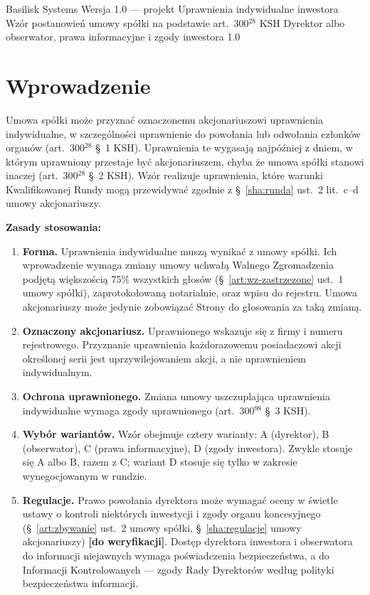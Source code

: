 \documentclass[11pt,a4paper]{report}
\newcommand{\field}[1]{\textbf{[#1]}}
\newcommand{\US}[1]{§~#1 umowy spółki}
\newcommand{\UA}[1]{§~#1 umowy akcjonariuszy}
\begin{document}
\BusinessPlanTitlePage
  {Basilisk Systems}
  {Wersja 1.0 --- projekt}
  {Uprawnienia indywidualne inwestora}
  {Wzór postanowień umowy spółki na podstawie art.~300$^{28}$ KSH}
  {Dyrektor albo obserwator, prawa informacyjne i zgody inwestora}
  {1.0}

\tableofcontents
\newpage

\chapter*{Wprowadzenie}

Umowa spółki może przyznać oznaczonemu akcjonariuszowi uprawnienia indywidualne, w szczególności uprawnienie do powołania lub odwołania członków organów (art.~300$^{28}$ §~1 KSH). Uprawnienia te wygasają najpóźniej z dniem, w którym uprawniony przestaje być akcjonariuszem, chyba że umowa spółki stanowi inaczej (art.~300$^{28}$ §~2 KSH). Wzór realizuje uprawnienia, które warunki Kwalifikowanej Rundy mogą przewidywać zgodnie z \UA{\ref{sha:runda} ust.~2 lit.~c--d}.

\textbf{Zasady stosowania:}
\begin{enumerate}
  \item \textbf{Forma.} Uprawnienia indywidualne muszą wynikać z umowy spółki. Ich wprowadzenie wymaga zmiany umowy uchwałą Walnego Zgromadzenia podjętą większością 75\% wszystkich głosów (\US{\ref{art:wz-zastrzezone} ust.~1}), zaprotokołowaną notarialnie, oraz wpisu do rejestru. Umowa akcjonariuszy może jedynie zobowiązać Strony do głosowania za taką zmianą.
  \item \textbf{Oznaczony akcjonariusz.} Uprawnionego wskazuje się z firmy i numeru rejestrowego. Przyznanie uprawnienia każdorazowemu posiadaczowi akcji określonej serii jest uprzywilejowaniem akcji, a nie uprawnieniem indywidualnym.
  \item \textbf{Ochrona uprawnionego.} Zmiana umowy uszczuplająca uprawnienia indywidualne wymaga zgody uprawnionego (art.~300$^{98}$ §~3 KSH).
  \item \textbf{Wybór wariantów.} Wzór obejmuje cztery warianty: A (dyrektor), B (obserwator), C (prawa informacyjne), D (zgody inwestora). Zwykle stosuje się A albo B, razem z C; wariant D stosuje się tylko w zakresie wynegocjowanym w rundzie.
  \item \textbf{Regulacje.} Prawo powołania dyrektora może wymagać oceny w świetle ustawy o kontroli niektórych inwestycji i zgody organu koncesyjnego (\US{\ref{art:zbywanie} ust.~2}, \UA{\ref{sha:regulacje}}) \field{do weryfikacji}. Dostęp dyrektora inwestora i obserwatora do informacji niejawnych wymaga poświadczenia bezpieczeństwa, a do Informacji Kontrolowanych --- zgody Rady Dyrektorów według polityki bezpieczeństwa informacji.
\end{enumerate}
\end{document}
